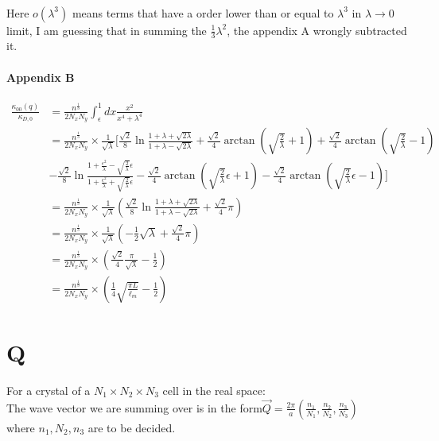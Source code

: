 \documentclass{article}
\begin{document}
\paragraph*{}
Here $o(\lambda^3)$ means terms that have a order lower than or equal to $\lambda^3$ in $\lambda\longrightarrow 0$ limit, I am guessing that in summing the $\frac{1}{3}\lambda^2$, the appendix A wrongly subtracted it.

\paragraph*{Appendix B}
\begin{align*}
\frac{\kappa_{00}(q)}{\kappa_{D,0}}&= \frac{n^{\frac{1}{3}}}{2N_xN_y}\int_\epsilon^1 dx\frac{x^2}{x^4+\lambda^4}\\
&= \frac{n^{\frac{1}{3}}}{2N_xN_y}\times \frac{1}{\sqrt{\lambda}}[\frac{\sqrt{2}}{8}\ln\frac{1+\lambda+\sqrt{2\lambda}}{1+\lambda-\sqrt{2\lambda}}+\frac{\sqrt{2}}{4}\arctan(\sqrt{\frac{2}{\lambda}}+1)+\frac{\sqrt{2}}{4}\arctan(\sqrt{\frac{2}{\lambda}}-1)\\
&-\frac{\sqrt{2}}{8}\ln\frac{1+\frac{\epsilon^2}{\lambda}-\sqrt{\frac{2}{\lambda}}\epsilon}{1+\frac{\epsilon^2}{\lambda}+\sqrt{\frac{2}{\lambda}}\epsilon}-\frac{\sqrt{2}}{4}\arctan(\sqrt{\frac{2}{\lambda}}\epsilon+1)-\frac{\sqrt{2}}{4}\arctan(\sqrt{\frac{2}{\lambda}}\epsilon-1)]\\
&=\frac{n^{\frac{1}{3}}}{2N_xN_y}\times \frac{1}{\sqrt{\lambda}}(\frac{\sqrt{2}}{8}\ln\frac{1+\lambda+\sqrt{2\lambda}}{1+\lambda-\sqrt{2\lambda}}+\frac{\sqrt{2}}{4}\pi)\\
&=\frac{n^{\frac{1}{3}}}{2N_xN_y}\times \frac{1}{\sqrt{\lambda}}(-\frac{1}{2}\sqrt{\lambda}+\frac{\sqrt{2}}{4}\pi)\\
&=\frac{n^{\frac{1}{3}}}{2N_xN_y}\times(\frac{\sqrt{2}}{4}\frac{\pi}{\sqrt{\lambda}}-\frac{1}{2})\\
&=\frac{n^{\frac{1}{3}}}{2N_xN_y}\times(\frac{1}{4}\sqrt{\frac{\pi L}{\ell_m}}- \frac{1}{2})
\end{align*}

\section*{Q}
For  a crystal of a $N_1\times N_2\times N_3$ cell in the real space: \\
The wave vector we are summing over is in the form$\vec{Q}=\frac{2\pi}{a}(\frac{n_1}{N_1},\frac{n_2}{N_2},\frac{n_3}{N_3})$\\
where $n_1,N_2,n_3$ are to be decided.
\end{document}
